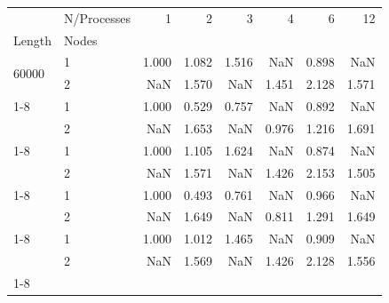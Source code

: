 \begin{tabular}{llrrrrrr}
\toprule
 & N/Processes & 1 & 2 & 3 & 4 & 6 & 12 \\
Length & Nodes &  &  &  &  &  &  \\
\midrule
\multirow[t]{2}{*}{60000} & 1 & 1.000 & 1.082 & 1.516 & NaN & 0.898 & NaN \\
 & 2 & NaN & 1.570 & NaN & 1.451 & 2.128 & 1.571 \\
\cline{1-8}
\multirow[t]{2}{*}{90000} & 1 & 1.000 & 0.529 & 0.757 & NaN & 0.892 & NaN \\
 & 2 & NaN & 1.653 & NaN & 0.976 & 1.216 & 1.691 \\
\cline{1-8}
\multirow[t]{2}{*}{120000} & 1 & 1.000 & 1.105 & 1.624 & NaN & 0.874 & NaN \\
 & 2 & NaN & 1.571 & NaN & 1.426 & 2.153 & 1.505 \\
\cline{1-8}
\multirow[t]{2}{*}{150000} & 1 & 1.000 & 0.493 & 0.761 & NaN & 0.966 & NaN \\
 & 2 & NaN & 1.649 & NaN & 0.811 & 1.291 & 1.649 \\
\cline{1-8}
\multirow[t]{2}{*}{180000} & 1 & 1.000 & 1.012 & 1.465 & NaN & 0.909 & NaN \\
 & 2 & NaN & 1.569 & NaN & 1.426 & 2.128 & 1.556 \\
\cline{1-8}
\bottomrule
\end{tabular}
